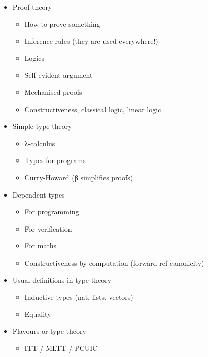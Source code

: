 
\begin{itemize}
  \item Proof theory
    \begin{itemize}
      \item How to prove something
      \item Inference rules (they are used everywhere!)
      \item Logics
      \item Self-evident argument
      \item Mechanised proofs
      \item Constructiveness, classical logic, linear logic
    \end{itemize}
  \item Simple type theory
    \begin{itemize}
      \item λ-calculus
      \item Types for programs
      \item Curry-Howard (β simplifies proofs)
    \end{itemize}
  \item Dependent types
    \begin{itemize}
      \item For programming
      \item For verification
      \item For maths
      \item Constructiveness by computation (forward ref canonicity)
    \end{itemize}
  \item Usual definitions in type theory
    \begin{itemize}
      \item Inductive types (nat, lists, vectors)
      \item Equality
    \end{itemize}
  \item Flavours or type theory
    \begin{itemize}
      \item ITT / MLTT / PCUIC

\end{itemize}
\end{itemize}
